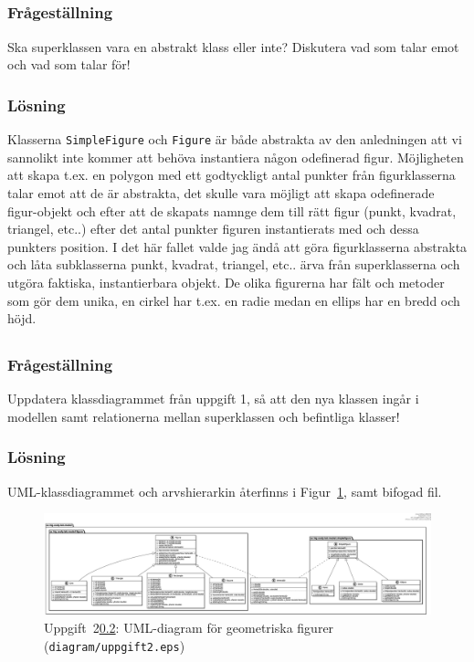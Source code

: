 \subsection{}\label{sec:uppg2b}
\subsubsection*{Frågeställning}
Ska superklassen vara en abstrakt klass eller inte? Diskutera vad som talar
emot och vad som talar för!

\subsubsection*{Lösning}
Klasserna \texttt{SimpleFigure} och \texttt{Figure} är både abstrakta av den
anledningen att vi sannolikt inte kommer att behöva instantiera någon odefinerad
figur. Möjligheten att skapa t.ex. en polygon med ett godtyckligt antal punkter
från figurklasserna talar emot att de är abstrakta, det skulle vara möjligt att
skapa odefinerade figur-objekt och efter att de skapats namnge dem till
rätt figur (punkt, kvadrat, triangel, etc..) efter det antal punkter figuren
instantierats med och dessa punkters position.
I det här fallet valde jag ändå att göra figurklasserna abstrakta och låta
subklasserna punkt, kvadrat, triangel, etc.. ärva från superklasserna och
utgöra faktiska, instantierbara objekt.
De olika figurerna har fält och metoder som gör dem unika, en cirkel har t.ex.
en radie medan en ellips har en bredd och höjd.


\subsection{}\label{sec:uppg2c}
\subsubsection*{Frågeställning}
Uppdatera klassdiagrammet från uppgift 1, så att den nya klassen ingår i
modellen samt relationerna mellan superklassen och befintliga klasser!

\subsubsection*{Lösning}
\par UML-klassdiagrammet och arvshierarkin återfinns i Figur~\ref{fig:uppg2a},
 samt bifogad fil.

\begin{figure}
\centering
\includegraphics[width=\linewidth]{diagram/uppgift2.eps}
\caption{Uppgift~2\ref{sec:uppg2c}: UML-diagram för geometriska figurer
(\texttt{diagram/uppgift2.eps})}
\label{fig:uppg2a}
\end{figure}


